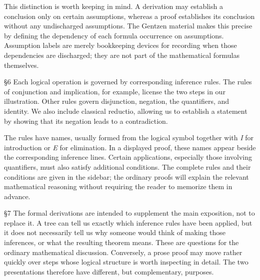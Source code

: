 This distinction is worth keeping in mind. A derivation may establish a conclusion only on certain assumptions, whereas a proof establishes its conclusion without any undischarged assumptions. The Gentzen material makes this precise by defining the dependency of each formula occurrence on assumptions. Assumption labels are merely bookkeeping devices for recording when those dependencies are discharged; they are not part of the mathematical formulas themselves.

\begin{formalderivation}

\end{formalderivation}

§6 \quad Each logical operation is governed by corresponding inference rules. The rules of conjunction and implication, for example, license the two steps in our illustration. Other rules govern disjunction, negation, the quantifiers, and identity. We also include classical reductio, allowing us to establish a statement by showing that its negation leads to a contradiction.

The rules have names, usually formed from the logical symbol together with \textit{I} for introduction or \textit{E} for elimination. In a displayed proof, these names appear beside the corresponding inference lines. Certain applications, especially those involving quantifiers, must also satisfy additional conditions. The complete rules and their conditions are given in the sidebar; the ordinary proofs will explain the relevant mathematical reasoning without requiring the reader to memorize them in advance.

\begin{formalderivation}

\end{formalderivation}

\begin{formalderivation}

\end{formalderivation}

§7 \quad The formal derivations are intended to supplement the main exposition, not to replace it. A tree can tell us exactly which inference rules have been applied, but it does not necessarily tell us why someone would think of making those inferences, or what the resulting theorem means. These are questions for the ordinary mathematical discussion. Conversely, a prose proof may move rather quickly over steps whose logical structure is worth inspecting in detail. The two presentations therefore have different, but complementary, purposes.

